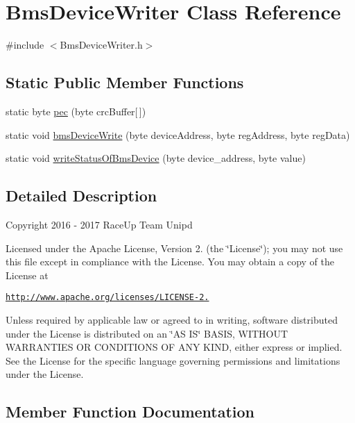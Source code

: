 \hypertarget{class_bms_device_writer}{}\section{Bms\+Device\+Writer Class Reference}
\label{class_bms_device_writer}


{\ttfamily \#include $<$Bms\+Device\+Writer.\+h$>$}

\subsection*{Static Public Member Functions}
\begin{DoxyCompactItemize}
\item 
static byte \hyperlink{class_bms_device_writer_af8c0e16d59c6f11848fea970e726592b}{pec} (byte crc\+Buffer\mbox{[}$\,$\mbox{]})
\item 
static void \hyperlink{class_bms_device_writer_a0f1433d379e82698c1d48abd8e935e13}{bms\+Device\+Write} (byte device\+Address, byte reg\+Address, byte reg\+Data)
\item 
static void \hyperlink{class_bms_device_writer_a43507694298062698dd72e1ff7599bea}{write\+Status\+Of\+Bms\+Device} (byte device\+\_\+address, byte value)
\end{DoxyCompactItemize}


\subsection{Detailed Description}
Copyright 2016 -\/ 2017 Race\+Up Team Unipd

Licensed under the Apache License, Version 2. (the \char`\"{}\+License\char`\"{}); you may not use this file except in compliance with the License. You may obtain a copy of the License at

\href{http://www.apache.org/licenses/LICENSE-2.0}{\tt http\+://www.\+apache.\+org/licenses/\+L\+I\+C\+E\+N\+S\+E-\/2.}

Unless required by applicable law or agreed to in writing, software distributed under the License is distributed on an \char`\"{}\+A\+S I\+S\char`\"{} B\+A\+S\+IS, W\+I\+T\+H\+O\+UT W\+A\+R\+R\+A\+N\+T\+I\+ES OR C\+O\+N\+D\+I\+T\+I\+O\+NS OF A\+NY K\+I\+ND, either express or implied. See the License for the specific language governing permissions and limitations under the License. 

\subsection{Member Function Documentation}
